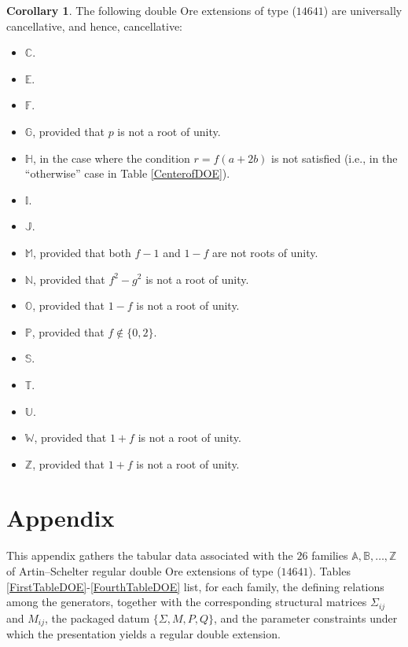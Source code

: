 \documentclass{amsart}
\theoremstyle{definition}
\newtheorem{corollary}[theorem]{Corollary}
\theoremstyle{remark}
\numberwithin{equation}{section}
\begin{document}
\begin{corollary} The following double Ore extensions of type ($14641$) are universally cancellative, and hence, cancellative:
\begin{itemize}
    \item $\mathbb{C}$.
    \item $\mathbb{E}$.
    \item $\mathbb{F}$.
    \item $\mathbb{G}$, provided that $p$ is not a root of unity.
    \item $\mathbb{H}$, in the case where the condition $r=f(a+2b)$ is not satisfied (i.e., in the ``otherwise'' case in Table \ref{CenterofDOE}).
    \item $\mathbb{I}$.
    \item $\mathbb{J}$.
    \item $\mathbb{M}$, provided that both $f-1$ and $1-f$ are not roots of unity.
    \item $\mathbb{N}$, provided that $f^2-g^2$ is not a root of unity.
    \item $\mathbb{O}$, provided that $1-f$ is not a root of unity.
    \item $\mathbb{P}$, provided that $f\notin\{0,2\}$.
    \item $\mathbb{S}$.
    \item $\mathbb{T}$.
    \item $\mathbb{U}$.
    \item $\mathbb{W}$, provided that $1+f$ is not a root of unity.
    \item $\mathbb{Z}$, provided that $1+f$ is not a root of unity.
\end{itemize}
\end{corollary}

\section*{Appendix}

This appendix gathers the tabular data associated with the $26$ families
$\mathbb{A},\mathbb{B},\dots,\mathbb{Z}$ of Artin--Schelter regular double Ore extensions of type ($14641$).
Tables \ref{FirstTableDOE}-\ref{FourthTableDOE} list, for each family, the defining relations among the generators,
together with the corresponding structural matrices $\Sigma_{ij}$ and $M_{ij}$, the packaged datum $\{\Sigma,M,P,Q\}$,
and the parameter constraints under which the presentation yields a regular double extension.
\end{document}
